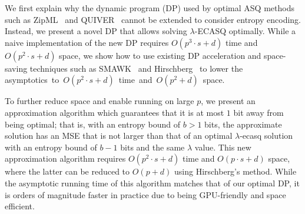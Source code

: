 \documentclass[11pt,letterpaper]{article}
\newcommand{\SV}[1]{\textcolor{blue}{SV:~#1}}
\newcommand{\MM}[1]{\textcolor{purple}{MM:~#1}}
\newcommand{\SV}[1]{}
\newcommand{\MM}[1]{}
\begin{document}
We first explain why the dynamic program (DP) used by optimal ASQ methods such as ZipML~\cite{zhang2017zipml} and QUIVER~\cite{ben2024optimal} cannot be extended to consider entropy encoding.
Instead, we present a novel DP that allows solving $\lambda$-ECASQ optimally. While a naive implementation of the new DP requires $O(p^3\cdot s + d)$ time and $O(p^2\cdot s + d)$ space, we show how to use existing DP acceleration and space-saving techniques such as SMAWK~\cite{aggarwal1986geometric} and Hirschberg~\cite{hirschberg1975linear} to lower the \mbox{asymptotics to $O(p^2\cdot s + d)$ time and $O(p^2 + d)$ space.}

To further reduce space and enable running on large $p$, we present an approximation algorithm which guarantees that it is at most $1$ bit away from being optimal; that is, with an entropy bound of $b>1$ bits, the approximate solution has an MSE that is not larger than that of an optimal $\lambda$-ecasq solution with an entropy bound of $b-1$ bits and the same $\lambda$ value.
This new approximation algorithm requires $O(p^2\cdot s + d)$ time and $O(p\cdot s + d)$ space, where the latter can be reduced to $O(p + d)$ using Hirschberg's method.
While the asymptotic running time of this algorithm matches that of our optimal DP, it is orders of magnitude faster in practice due to being GPU-friendly and space efficient. %



\end{document}

